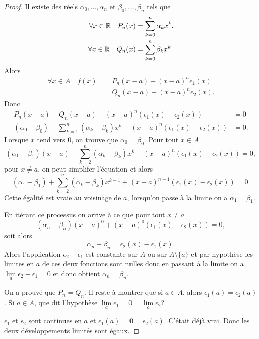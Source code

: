 \begin{proof}
  Il existe des réels \(\alpha_0, \ldots, \alpha_n\) et \(\beta_0, \ldots,
  \beta_n\) tels que
  \begin{align}
    \forall x \in \mathbb{R} \quad P_n(x) & = \sum_{k=0}^n \alpha_k x^k, \\
    \forall x \in \mathbb{R} \quad Q_n(x) & = \sum_{k=0}^n \beta_k x^k.
  \end{align}
  Alors
  \begin{align}
    \forall x \in A \quad f(x) & =P_n(x-a) + (x-a)^n \epsilon_1(x)\\
    & = Q_n(x-a) + (x-a)^n \epsilon_2(x).
  \end{align}
  Donc
  \begin{align}
    P_n(x-a)-Q_n(x-a)+ (x-a)^n (\epsilon_1(x)- \epsilon_2(x)) &=0 \\
    (\alpha_0-\beta_0)+\sum_{k=1}^n (\alpha_k - \beta_k) x^k + (x-a)^n
    (\epsilon_1(x)- \epsilon_2(x)) &=0.
  \end{align}
  Lorsque \(x\) tend vers \(0\), on trouve que \(\alpha_0=\beta_0\). Pour tout
  \(x \in A\)
  \begin{equation}
    (\alpha_1-\beta_1)(x-a) +\sum_{k=2}^n (\alpha_k - \beta_k) x^k + (x-a)^n
    (\epsilon_1(x)- \epsilon_2(x)) =0,
  \end{equation}
  pour \(x \neq a\), on peut simplifer l'équation et alors
  \begin{equation}
    (\alpha_1-\beta_1) +\sum_{k=2}^n (\alpha_k - \beta_k) x^{k-1} + (x-a)^{n-1}
    (\epsilon_1(x)- \epsilon_2(x)) =0.
  \end{equation}
  Cette égalité est vraie au voisinage de \(a\), lorsqu'on passe à la limite on
  a \(\alpha_1=\beta_1\).

  En itérant ce processus on arrive à ce que pour tout \(x \neq a\)
  \begin{equation}
    (\alpha_n - \beta_n) (x-a)^0 + (x-a)^0 (\epsilon_1(x)-\epsilon_2(x))=0,
  \end{equation}
  soit alors
  \begin{equation}
    \alpha_n - \beta_n = \epsilon_2(x)-\epsilon_1(x).
  \end{equation}
  Alors l'application \(\epsilon_2 - \epsilon_1\) est constante sur \(A\) ou sur
  \(A\setminus\{a\}\) et par hypothèse les limites en \(a\) de ces deux
  fonctions sont nulles donc en passant à la limite on a \(\lim\limits_{a}
  \epsilon_2 - \epsilon_1 =0\) et donc obtient \(\alpha_n = \beta_n\).

  On a prouvé que \(P_n=Q_n\). Il reste à montrer que si \(a \in A\), alors
  \(\epsilon_1(a)=\epsilon_2(a)\). Si \(a \in A\), que dit l'hypothèse
  \(\lim\limits_{a} \epsilon_1=0=\lim\limits_{a} \epsilon_2\)?

  \(\epsilon_1\) et \(\epsilon_2\) sont continues en \(a\) et
  \(\epsilon_1(a)=0=\epsilon_2(a)\). C'était déjà vrai. Donc les deux
  développements limités sont égaux.
\end{proof}

